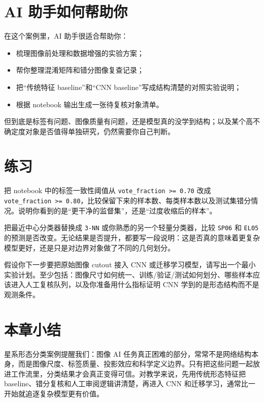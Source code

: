 \section{AI 助手如何帮助你}

在这个案例里，AI 助手很适合帮助你：

\begin{itemize}
    \item 梳理图像前处理和数据增强的实验方案；
    \item 帮你整理混淆矩阵和错分图像复查记录；
    \item 把“传统特征 baseline”和“CNN baseline”写成结构清楚的对照实验说明；
    \item 根据 notebook 输出生成一张待复核对象清单。
\end{itemize}

但到底是标签有问题、图像质量有问题，还是模型真的没学到结构；以及某个高不确定度对象是否值得单独研究，仍然需要你自己判断。

\section{练习}

\begin{exercisebox}[基础练习]
把 notebook 中的标签一致性阈值从 \texttt{vote\_fraction >= 0.70} 改成 \texttt{vote\_fraction >= 0.80}，比较保留下来的样本数、每类样本数以及测试集错分情况。说明你看到的是“更干净的监督集”，还是“过度收缩后的样本”。
\end{exercisebox}

\begin{exercisebox}[进阶练习]
把最近中心分类器替换成 \texttt{3-NN} 或你熟悉的另一个轻量分类器，比较 \texttt{SP06} 和 \texttt{EL05} 的预测是否改变。无论结果是否提升，都要写一段说明：这是否真的意味着更复杂模型更好，还是只是对边界对象做了不同的几何划分。
\end{exercisebox}

\begin{exercisebox}[开放练习]
假设你下一步要把原始图像 cutout 接入 CNN 或迁移学习模型，请写出一个最小实验计划。至少包括：图像尺寸如何统一、训练/验证/测试如何划分、哪些样本应该进入人工复核队列，以及你准备用什么指标证明 CNN 学到的是形态结构而不是观测条件。
\end{exercisebox}

\section{本章小结}

星系形态分类案例提醒我们：图像 AI 任务真正困难的部分，常常不是网络结构本身，而是图像尺度、标签质量、投影效应和科学定义边界。只有把这些问题一起放进工作流里，分类结果才会真正变得可信。对教学来说，先用传统形态特征把 baseline、错分复核和人工审阅逻辑讲清楚，再进入 CNN 和迁移学习，通常比一开始就追逐复杂模型更有价值。
